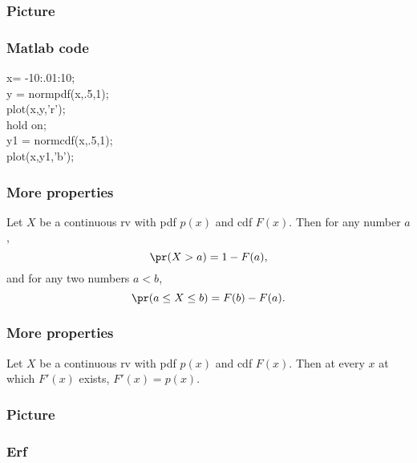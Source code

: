 \begin{frame}[fragile]\frametitle{Picture}



\end{frame}


\begin{frame}[fragile]\frametitle{Matlab code}

\begin{tabbing}
x= -10:.01:10; \\
y = normpdf(x,.5,1);\\
plot(x,y,'r');\\
hold on;\\
y1 = normcdf(x,.5,1);\\
plot(x,y1,'b');\\
\end{tabbing}
\end{frame}





\begin{frame}[fragile]\frametitle{More properties}

\begin{prop}
Let $X$ be a continuous rv with pdf $p(x)$ and cdf $F(x)$. Then for
any number $a$,
$$\pr(X > a) = 1- F(a),$$ 
and for any two numbers $a<b$,
$$\pr(a \leq X \leq b) = F(b)-F(a).$$
\end{prop} 


\end{frame}

\begin{frame}[fragile]\frametitle{More properties}

\begin{thm}
Let $X$ be a continuous rv with pdf $p(x)$ and cdf $F(x)$. Then at
every $x$ at which $F'(x)$ exists, $F'(x) = p(x)$.
\end{thm} 



\end{frame}


\begin{frame}[fragile]\frametitle{Picture}



\end{frame}

\begin{frame}[fragile]\frametitle{Erf}



\end{frame}


